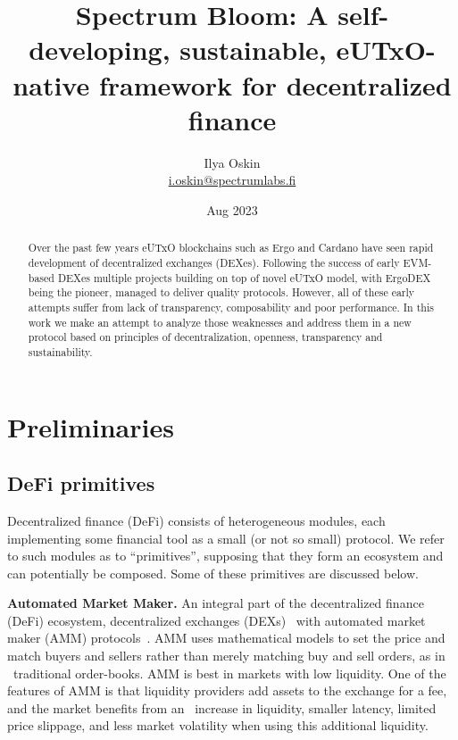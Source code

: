 \documentclass[11pt]{article}
\title{Spectrum Bloom: A self-developing, sustainable, eUTxO-native framework for decentralized finance}
\author{Ilya Oskin \\ \href{mailto:i.oskin@spectrumlabs.fi}{i.oskin@spectrumlabs.fi}}
\date{Aug 2023}
\begin{document}
    \begin{sloppypar}
        \maketitle


        \begin{abstract}
            Over the past few years eUTxO blockchains such as Ergo and Cardano have seen rapid development of decentralized exchanges (DEXes).
            Following the success of early EVM-based DEXes multiple projects building on top of novel eUTxO model, with ErgoDEX being the pioneer, managed to deliver quality protocols.
            However, all of these early attempts suffer from lack of transparency, composability and poor performance.
            In this work we make an attempt to analyze those weaknesses and address them in a new protocol based on principles of decentralization, openness, transparency and sustainability.
        \end{abstract}


        \section{Preliminaries}\label{sec:preliminaries}

        \subsection{DeFi primitives}\label{subsec:defi-primitives}
        Decentralized finance (DeFi) consists of heterogeneous modules, each implementing some financial tool as a small (or not so small) protocol.
        We refer to such modules as to \enquote{primitives}, supposing that they form an ecosystem and can potentially be composed.
        Some of these primitives are discussed below.

        \textbf{Automated Market Maker.} An integral part of the decentralized finance (DeFi) ecosystem, decentralized exchanges (DEXs) \
        with automated market maker (AMM) protocols~\cite{Xu_2023}.
        AMM uses mathematical models to set the price and match buyers and sellers rather than merely matching buy and sell orders, as in \
        traditional order-books.
        AMM is best in markets with low liquidity.
        One of the features of AMM is that liquidity providers add assets to the exchange for a fee, and the market benefits from an \
        increase in liquidity, smaller latency, limited price slippage, and less market volatility when using this additional liquidity.


\end{sloppypar}
\end{document}
